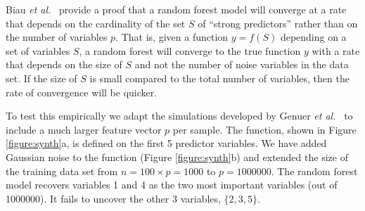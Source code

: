 \documentclass[10pt,letterpaper]{article}
\begin{document}
Biau {\it et al.}~\cite{Biau.2012} provide a proof that a random forest model will converge at a rate that depends on
the cardinality of the set $S$ of ``strong predictors'' rather than on the number of variables $p$. That is, given a
function $y=f(S)$ depending on a set of variables $S$, a random forest will converge to the true function $y$ with a
rate that depends on the size of $S$ and not the number of noise variables in the data set. If the size of $S$ is small
compared to the total number of variables, then the rate of convergence will be quicker.

To test this empirically we adapt the simulations developed by Genuer {\it et al.}~\cite{Genuer.et.al.2010} to include a
much larger feature vector $p$ per sample.  The function, shown in Figure \ref{figure:synth}a, is defined on the first 5
predictor variables. We have added Gaussian noise to the function (Figure \ref{figure:synth}b) and extended the size of
the training data set from $n=100 \times p=1000$ to $p=1000000$.
The random forest model recovers variables 1 and 4 as the two
most important variables (out of 1000000). It fails to uncover the other 3 variables, $\{2,3,5\}$.


\end{document}
